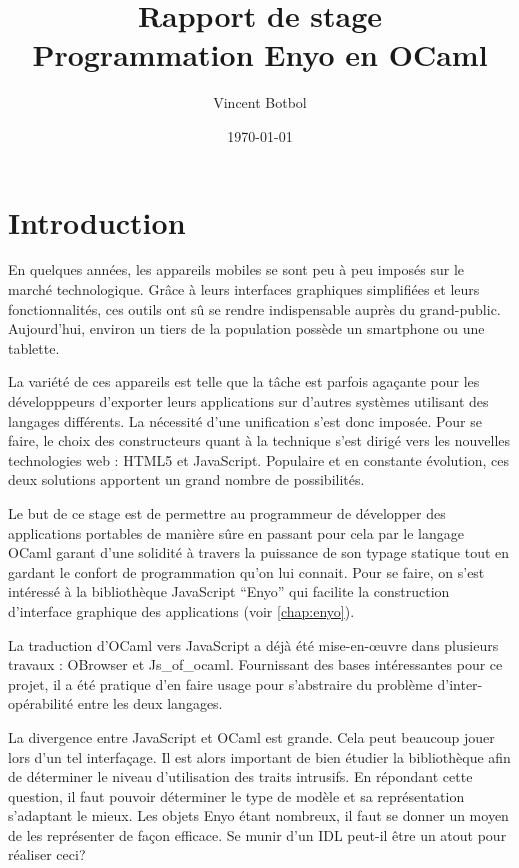 \documentclass[11pt,a4paper]{report}
\title{Rapport de stage\\Programmation Enyo en OCaml}
\author{Vincent Botbol}
\date\today
\begin{document}
\maketitle

\chapter{Introduction}

En quelques années, les appareils mobiles se sont peu à peu imposés sur le marché technologique.
Grâce à leurs interfaces graphiques simplifiées et leurs fonctionnalités, ces outils ont sû se 
rendre indispensable auprès du grand-public.
Aujourd'hui, environ un tiers de la population possède un smartphone ou une tablette.

La variété de ces appareils est telle que la tâche est parfois agaçante pour les développpeurs 
d'exporter leurs applications sur d'autres systèmes utilisant des langages différents.
La nécessité d'une unification s'est donc imposée. Pour se faire, le choix des constructeurs quant à
la technique s'est dirigé vers les nouvelles technologies web :
HTML5 et JavaScript. Populaire et en constante évolution, ces deux solutions apportent un grand nombre
de possibilités.

Le but de ce stage est de permettre au programmeur de développer des applications portables de manière sûre
en passant pour cela par le langage OCaml garant d'une solidité à travers la puissance de son typage statique
tout en gardant le confort de programmation qu'on lui connait.
Pour se faire, on s'est intéressé à la bibliothèque JavaScript ``Enyo'' qui facilite la construction d'interface
graphique des applications (voir \ref{chap:enyo}).

La traduction d'OCaml vers JavaScript a déjà été mise-en-\oe{}uvre dans plusieurs travaux : OBrowser
et Js\_of\_ocaml. Fournissant des bases intéressantes pour ce projet, il a été pratique d'en faire usage
pour s'abstraire du problème d'inter-opérabilité entre les deux langages.

La divergence entre JavaScript et OCaml est grande. Cela peut beaucoup jouer lors d'un tel 
interfaçage. Il est alors important de bien étudier la bibliothèque afin de déterminer le niveau
d'utilisation des traits intrusifs.
En répondant cette question, il faut pouvoir déterminer le type de modèle et sa représentation
s'adaptant le mieux.
Les objets Enyo étant nombreux, il faut se donner un moyen de les représenter 
de façon efficace. Se munir d'un IDL peut-il être un atout pour réaliser ceci?
\end{document}
